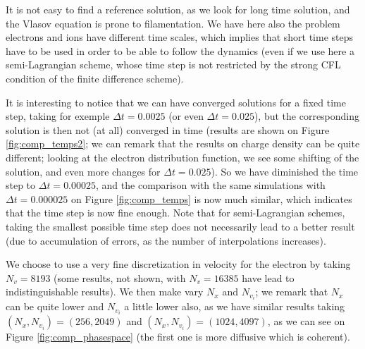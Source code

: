\documentclass{article}
\numberwithin{equation}{section}
\begin{document}
It is not easy to find a reference solution, as we look for long time solution, and the Vlasov equation is prone to filamentation. We have here also the problem electrons and ions have different time scales, which implies that short time steps have to be used in order to be able to follow the dynamics (even if we use here a semi-Lagrangian scheme, whose time step is not restricted by the strong CFL condition
of the finite difference scheme).

It is interesting to notice that we can have converged solutions for a fixed time step, taking for exemple $\Delta t = 0.0025$ (or even $\Delta t =0.025$), but the corresponding solution is then not (at all) converged in time
(results are shown on Figure \ref{fig:comp_temps2}; we can remark that the results on charge density can be quite different; looking at the electron distribution function, we see some shifting
of the solution, and even more changes for $\Delta t =0.025$). So we have diminished the time step to $\Delta t = 0.00025$, and the comparison with the same simulations with  $\Delta t = 0.000025$ on Figure \ref{fig:comp_temps} 
is now much similar, which indicates that the 
time step is now fine enough. Note that for semi-Lagrangian schemes, taking the smallest possible time step does not necessarily lead to a better result (due to accumulation of errors, as the number of interpolations 
increases).

We choose to use a very fine discretization in velocity for the electron by taking $N_v=8193$ (some results, not shown, with $N_v=16385$ have lead to indistinguishable results).
We then make vary $N_x$ and $N_{v_i}$; we remark that $N_x$ can be quite lower and $N_{v_i}$ a little lower also, as we have similar results taking $(N_x,N_{v_i})=(256,2049)$ and 
$(N_x,N_{v_i})=(1024,4097)$, as we can see on Figure \ref{fig:comp_phasespace} (the first one is more diffusive which is coherent). 
\end{document}
